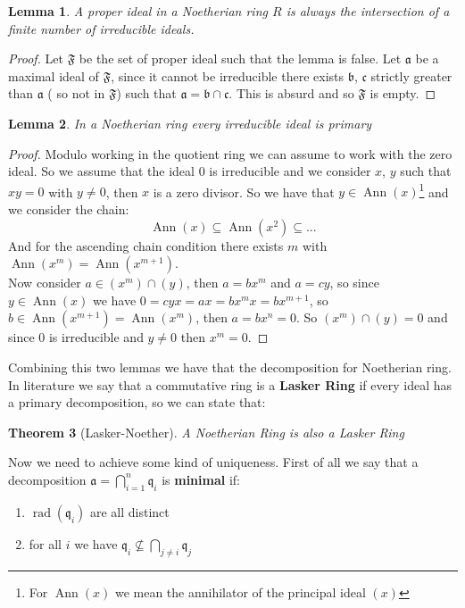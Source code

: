 \documentclass[a4wide]{book}
\theoremstyle{plain}
\newtheorem{teo}{Theorem}[section]
\newtheorem{lem}[teo]{Lemma}
\theoremstyle{remark}
\theoremstyle{definition}
\newcommand{\q}{\mathfrak{q}}
\newcommand{\A}{\mathfrak{a}}
\newcommand{\B}{\mathfrak{b}}
\newcommand{\Cc}{\mathfrak{c}}
\DeclareMathOperator{\rad}{rad}
\DeclareMathOperator{\Ann}{Ann}
\newcounter{que}
\begin{document}
\begin{lem}
	A proper ideal in a Noetherian ring $ R $ is always the intersection of a finite number of irreducible ideals.
\end{lem}

\begin{proof}
	Let $ \mathfrak{F} $ be the set of proper ideal such that the lemma is false. Let $ \A $ be a maximal ideal of $ \mathfrak{F} $, since it cannot be irreducible there exists $ \B $, $ \Cc $ strictly greater than $ \A $ ( so not in $ \mathfrak{F} $) such that $ \A = \B \cap \Cc $. This is absurd and so $ \mathfrak{F} $ is empty.
\end{proof}

\begin{lem}
	In a Noetherian ring every irreducible ideal is primary
\end{lem}

\begin{proof}
Modulo working in the quotient ring we can assume to work with the zero ideal. So we assume that the ideal $ 0 $ is irreducible and we consider $ x$, $y $ such that $ xy = 0 $ with $ y\neq 0 $, then $ x $ is a zero divisor. So we have that $ y \in \Ann(x) $\footnote{For $ \Ann(x) $ we mean the annihilator of the principal ideal $ (x) $} and we consider the chain:
$$ \Ann(x)  \subseteq \Ann(x^2) \subseteq ...$$
And for the ascending chain condition there exists $ m $ with $ \Ann(x^m)= \Ann(x^{m+1})$. \\
Now consider $ a \in (x^m)\cap (y) $, then $ a = bx^m $ and $ a = cy $, so since $ y \in \Ann(x) $ we have $ 0 = cyx = ax = bx^m x=  bx^{m+1}$, so $ b \in  \Ann(x^{m+1}) = \Ann(x^m) $, then $ a = bx^n = 0 $. So $ (x^m)\cap (y)=0 $ and since $ 0 $ is irreducible and $ y\neq 0 $ then $ x^m=0 $. 
\end{proof}

Combining this two lemmas we have that the decomposition for Noetherian ring. In literature we say that a commutative ring is a \textbf{Lasker Ring} if every ideal has a primary decomposition, so we can state that:

\begin{teo}[Lasker-Noether]
A Noetherian Ring is also a Lasker Ring
\end{teo}
Now we need to achieve some kind of uniqueness. First of all we say that a decomposition $ \A = \bigcap_{i=1}^n \q_i $ is \textbf{minimal} if:
\begin{enumerate}
\item $ \rad(\q_i) $ are all distinct
\item for all $ i $ we have $ \q_i \not \subseteq \bigcap_{j\neq i} \q_j $
\end{enumerate}
\end{document}
